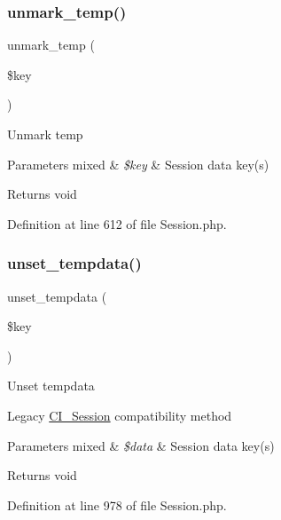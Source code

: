 \subsubsection{\texorpdfstring{unmark\_temp()}{unmark\_temp()}}
{\footnotesize\ttfamily unmark\+\_\+temp (\begin{DoxyParamCaption}\item[{}]{\$key }\end{DoxyParamCaption})}

Unmark temp


\begin{DoxyParams}[1]{Parameters}
mixed & {\em \$key} & Session data key(s) \\
\hline
\end{DoxyParams}
\begin{DoxyReturn}{Returns}
void 
\end{DoxyReturn}


Definition at line 612 of file Session.\+php.

\mbox{\label{class_c_i___session_a79d3115c19f6dfa873ca5f3a7929f24a}} 
\subsubsection{\texorpdfstring{unset\_tempdata()}{unset\_tempdata()}}
{\footnotesize\ttfamily unset\+\_\+tempdata (\begin{DoxyParamCaption}\item[{}]{\$key }\end{DoxyParamCaption})}

Unset tempdata

Legacy \mbox{\hyperlink{class_c_i___session}{C\+I\+\_\+\+Session}} compatibility method


\begin{DoxyParams}[1]{Parameters}
mixed & {\em \$data} & Session data key(s) \\
\hline
\end{DoxyParams}
\begin{DoxyReturn}{Returns}
void 
\end{DoxyReturn}


Definition at line 978 of file Session.\+php.

\mbox{\label{class_c_i___session_a8d3a4935d2ff2088f11654445d9a0122}} 
